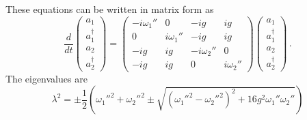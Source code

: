 These equations can be written in matrix form as
\begin{equation}
  \frac{d}{dt}
  \left( \begin{array}{c}
    a_1 \\ a_1^\dagger \\ a_2 \\ a_2^\dagger
  \end{array} \right)
  =
  \left( \begin{array}{cccc}
    -i \omega_1'' & 0 & -i g & i g \\
    0 & i \omega_1'' & -i g & ig \\
    -i g & i g & -i \omega_2'' & 0 \\
    -i g & i g & 0 & i \omega_2''
  \end{array} \right)
  \left( \begin{array}{c}
    a_1 \\ a_1^\dagger \\ a_2 \\ a_2^\dagger
  \end{array} \right)
  \, .
\end{equation}
The eigenvalues are
\begin{equation}
  \lambda^2 =
  \pm \frac{1}{2}
  \left(
    \omega_1''^2 + \omega_2''^2
    \pm \sqrt{(\omega_1''^2 - \omega_2''^2)^2 + 16 g^2 \omega_1'' \omega_2''}
  \right)
\end{equation}
